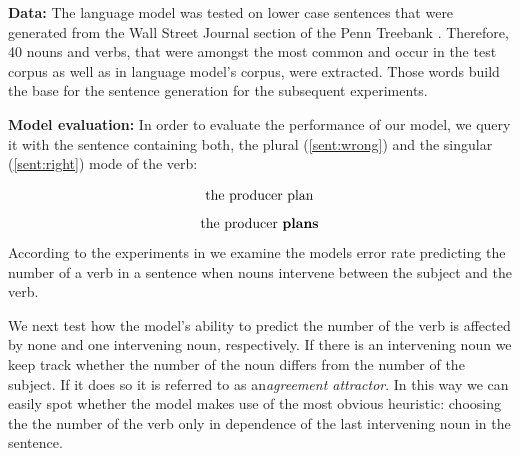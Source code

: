 \documentclass[twoside]{article}
\begin{document}
\begin{multicols}{2}
\textbf{Data:} 
The language model was tested on lower case sentences that were generated from the Wall Street Journal section of the Penn Treebank \citep{Marcus1993}. Therefore, 40 nouns and verbs, that were amongst the most common and occur in the test corpus as well as in language model's corpus, were extracted. Those words build the base for the sentence generation for the subsequent experiments. 

\textbf{Model evaluation:} In order to evaluate the performance of our model, we query it with the sentence containing both, the plural (\ref{sent:wrong}) and the singular (\ref{sent:right}) mode of the verb: 

\begin{equation}
	\label{sent:wrong}
	\textnormal{the producer plan}
\end{equation}
\begin{equation}
	\label{sent:right}
	\textnormal{the producer  \textbf{plans}}
\end{equation}
According to the experiments in \citep{Linzen2016} we examine the models error rate predicting the number of a verb in a sentence when nouns intervene between the subject and the verb. 

We next test how the model's ability to predict the number of the verb is affected by none and one intervening noun, respectively. If there is an intervening noun we keep track whether the number of the noun differs from the number of the subject. If it does so it is referred to as an\textit{agreement attractor}. In this way we can easily spot whether the model makes use of the most obvious heuristic: choosing the the number of the verb only in dependence of the last intervening noun in the sentence.
\end{multicols}
\end{document}
